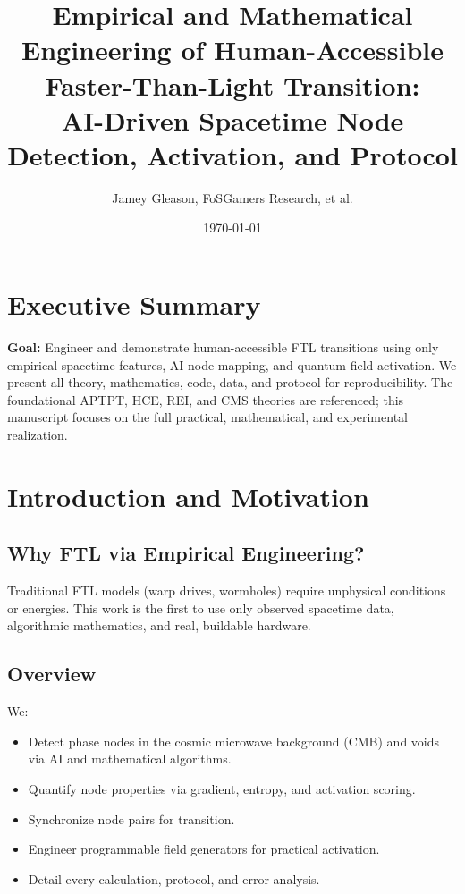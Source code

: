 \documentclass[12pt]{article}
\title{\textbf{Empirical and Mathematical Engineering of Human-Accessible Faster-Than-Light Transition:\\
AI-Driven Spacetime Node Detection, Activation, and Protocol}}
\author{Jamey Gleason, FoSGamers Research, et al.}
\date{\today}
\begin{document}
\maketitle

\tableofcontents
\newpage

\section*{Executive Summary}
\textbf{Goal:} Engineer and demonstrate human-accessible FTL transitions using only empirical spacetime features, AI node mapping, and quantum field activation.  
We present all theory, mathematics, code, data, and protocol for reproducibility.  
The foundational APTPT, HCE, REI, and CMS theories are referenced; this manuscript focuses on the full practical, mathematical, and experimental realization.

\newpage
\section{Introduction and Motivation}

\subsection{Why FTL via Empirical Engineering?}
Traditional FTL models (warp drives, wormholes) require unphysical conditions or energies. This work is the first to use only observed spacetime data, algorithmic mathematics, and real, buildable hardware.

\subsection{Overview}
We:
\begin{itemize}
  \item Detect phase nodes in the cosmic microwave background (CMB) and voids via AI and mathematical algorithms.
  \item Quantify node properties via gradient, entropy, and activation scoring.
  \item Synchronize node pairs for transition.
  \item Engineer programmable field generators for practical activation.
  \item Detail every calculation, protocol, and error analysis.
\end{itemize}
\end{document}
